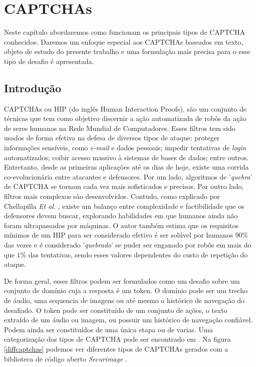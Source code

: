 \chapter{CAPTCHAs}\label{cap:captchas}

Neste capítulo abordaremos como funcionam os principais tipos de CAPTCHA conhecidos. Daremos um enfoque especial aos CAPTCHAs baseados em texto, objeto de estudo do presente trabalho e uma formulação mais precisa para o esse tipo de desafio é apresentada.

\section{Introdução}

CAPTCHAs \cite{captcha2003} ou HIP \cite{lectures2005HIP} (do inglês Human Interaction Proofs), são um conjunto de técnicas que tem como objetivo discernir a ação automatizada de robôs da ação de seres humanos na Rede Mundial de Computadores. Esses filtros tem sido usados de forma efetiva na defesa de diversos tipos de ataque: proteger informações sensíveis, como \textit{e-mail} e dados pessoais; impedir tentativas de \textit{login} automatizados; coibir acesso massivo à sistemas de bases de dados; entre outros. Entretanto, desde as primeiras aplicações até os dias de hoje, existe uma corrida co-evolucionária entre atacantes e defensores. Por um lado, algoritmos de '\textit{quebra}' de CAPTCHA se  tornam cada vez mais sofisticados e precisos. Por outro lado, filtros mais complexos são desenvolvidos. Contudo, como explicado por Chellapilla \textit{Et al.} \cite{lectures2005HIP}, existe um balanço entre complexidade e factibilidade que os defensores devem buscar, explorando habilidades em que humanos ainda não foram ultrapassados por máquinas. O autor também estima que os requisitos mínimos de um HIP para ser considerado efetivo é ser solúvel por humanos $90\%$ das vezes e é considerado '\textit{quebrado}' se puder ser enganado por robôs em mais do que $1\%$ das tentativas, sendo esses valores dependentes do custo de repetição do ataque.

De forma geral, esses filtros podem ser formulados como um desafio sobre um conjunto de domínio cuja a resposta é um token. O domínio pode ser um trecho de áudio, uma sequencia de imagens ou até mesmo o histórico de navegação do desafiado. O token pode ser constituído de um conjunto de ações, o texto extraído de um áudio ou imagem, ou possuir um histórico de navegação confiável. Podem ainda ser constituídos de uma única etapa ou de varias. Uma categorização dos tipos de CAPTCHA pode ser encontrado em \cite{singh2014survey}. Na figura \ref{diffcaptchas} podemos ver diferentes tipos de CAPTCHAs gerados com a biblioteca de código aberto \textit{Securimage} \cite{securimage}.

